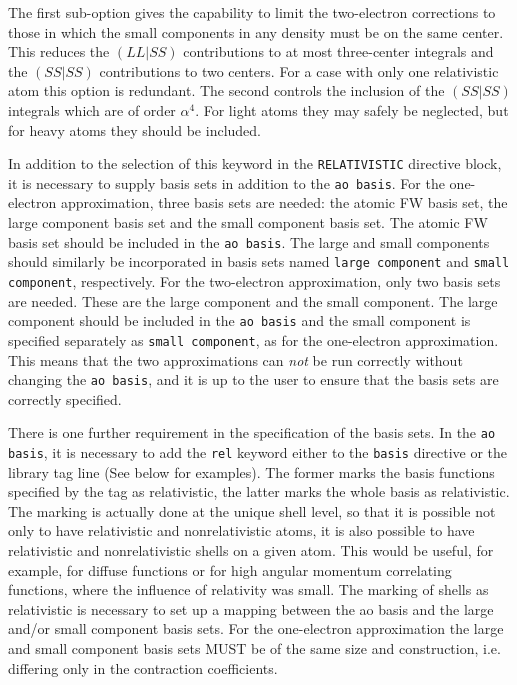 The first sub-option gives the capability to limit the two-electron
corrections to those in which the small components in any density must be on
the same center.  This reduces the $(LL|SS)$ contributions to at most
three-center integrals and the $(SS|SS)$ contributions to two centers. For a
case with only one relativistic atom this option is redundant. The second
controls the inclusion of the $(SS|SS)$ integrals which are of order
$\alpha^4$. For light atoms they may safely be neglected, but for heavy
atoms they should be included. 

In addition to the selection of this keyword in the \verb+RELATIVISTIC+
directive block, it is necessary to supply basis sets in addition to the
\verb+ao basis+. For the one-electron approximation, three basis sets are
needed: the atomic FW basis set, the large component basis set and the small
component basis set. The atomic FW basis set should be included in the
\verb+ao basis+.
The large and small components should similarly be incorporated
in basis sets named \verb+large component+ and \verb+small component+,
respectively. For the two-electron approximation, only two basis sets are
needed. These are the large component and the small component. The large component
should be included in the \verb+ao basis+ and the small component
is specified separately as \verb+small component+, as for the one-electron
approximation. This means that the two approximations can {\it not} be run
correctly without changing the \verb+ao basis+, and it is up to the user to
ensure that the basis sets are correctly specified.

There is one further requirement in the specification of the basis sets. In
the \verb+ao basis+, it is necessary to add the \verb+rel+ keyword either to the
\verb+basis+ directive or the library tag line (See below for examples). 
The former marks the basis
functions specified by the tag as relativistic, the latter marks the whole
basis as relativistic. The marking is actually done at the unique shell
level, so that it is possible not only to have relativistic and
nonrelativistic atoms, it is also possible to have relativistic and
nonrelativistic shells on a given atom. This would be useful, for example,
for diffuse functions or for high angular momentum correlating functions,
where the influence of relativity was small. The marking of shells as
relativistic is necessary to set up a mapping between the ao basis and the
large and/or small component basis sets. For the one-electron approximation
the large and small component basis sets MUST be of the same size and
construction, i.e. differing only in the contraction coefficients.

